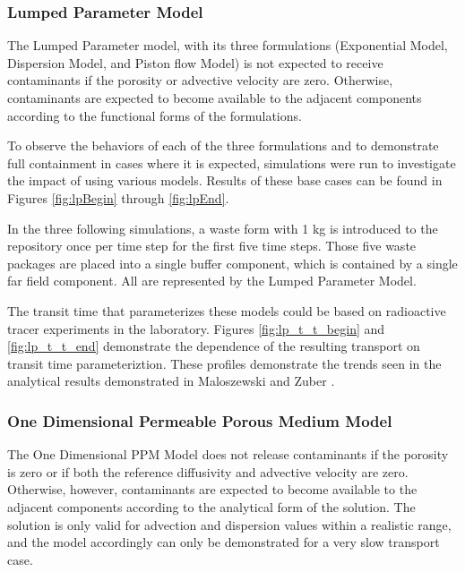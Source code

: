 
\FloatBarrier

\subsubsection{Lumped Parameter Model}

The Lumped Parameter model, with its three formulations (Exponential Model, 
Dispersion Model, and Piston flow Model) is not expected to receive 
contaminants if the porosity or advective velocity are zero. Otherwise, 
contaminants are expected to  become available to the adjacent components 
according to the functional forms of the formulations. 

To observe the behaviors of each of the three formulations and to demonstrate 
full containment in cases where it is expected, simulations were run to 
investigate the impact of using various models. Results of these base cases can be found in Figures 
\ref{fig:lpBegin} through \ref{fig:lpEnd}.

In the three following simulations, a waste form with 1 kg is introduced to the repository once 
per time step for the first five time steps. Those five waste packages are 
placed into a single buffer component, which is contained by a single far field 
component. All are represented by the Lumped Parameter Model.



The transit time that parameterizes these models could be based on radioactive 
tracer experiments in the laboratory. Figures \ref{fig:lp_t_t_begin} 
and \ref{fig:lp_t_t_end} demonstrate the dependence of the resulting transport on 
transit time parameteriztion. These profiles demonstrate the trends seen in the 
analytical results demonstrated in Maloszewski and Zuber 
\cite{maloszewski_lumped_1996}.



\subsubsection{One Dimensional Permeable Porous Medium Model}
The One Dimensional PPM Model does not release contaminants if the porosity is 
zero or if both the reference diffusivity and advective velocity are zero. 
Otherwise, however, contaminants are expected to  become available to the adjacent 
components according to the analytical form of the solution. The solution is 
only valid for advection and dispersion values within a realistic range, and 
the model accordingly can only be demonstrated for a very slow transport case. 


